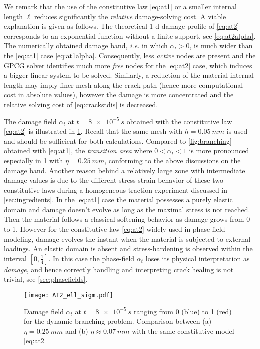 We remark that the use of the constitutive law \eqref{eq:at1} or a smaller internal length $\ell$ reduces significantly the \emph{relative} damage-solving cost. A viable explanation is given as follows. The theoretical 1-d damage profile of \eqref{eq:at2} corresponds to an exponential function without a finite support, see \eqref{eq:at2alpha}. The numerically obtained damage band, \emph{i.e.} in which $\alpha_t>0$, is much wider than the \eqref{eq:at1} case \eqref{eq:at1alpha}. Consequently, less \emph{active} nodes are present and the GPCG solver identifies much more \emph{free} nodes for the \eqref{eq:at2} case, which induces a bigger linear system to be solved. Similarly, a reduction of the material internal length may imply finer mesh along the crack path (hence more computational cost in absolute values), however the damage is more concentrated and the relative solving cost of \eqref{eq:crackstdis} is decreased.

The damage field $\alpha_t$ at $t=\SI{8e-5}{s}$ obtained with the constitutive law \eqref{eq:at2} is illustrated in \cref{fig:at2_ell_sigm}. Recall that the same mesh with $h=\SI{0.05}{mm}$ is used and should be sufficient for both calculations. Compared to \cref{fig:branching} obtained with \eqref{eq:at1}, the \emph{transition area} where $0<\alpha_t<1$ is more pronounced especially in \cref{fig:at2_ell_sigm} with $\eta=\SI{0.25}{mm}$, conforming to the above discussions on the damage band. Another reason behind a relatively large zone with intermediate damage values is due to the different stress-strain behavior of these two constitutive laws during a homogeneous traction experiment discussed in \cref{sec:ingredients}. In the \eqref{eq:at1} case the material possesses a purely elastic domain and damage doesn't evolve as long as the maximal stress is not reached. Then the material follows a classical softening behavior as damage grows from 0 to 1. However for the constitutive law \eqref{eq:at2} widely used in phase-field modeling, damage evolves the instant when the material is subjected to external loadings. An elastic domain is absent and stress-hardening is observed within the interval $[0,\frac{1}{4}]$. In this case the phase-field $\alpha_t$ loses its physical interpretation as \emph{damage}, and hence correctly handling and interpreting crack healing is not trivial, see \cref{sec:phasefields}.
\begin{figure}[htbp]
\centering
\texttt{[image: AT2\_ell\_sigm.pdf]}
\caption{Damage field $\alpha_t$ at $t=\SI{8e-5}{s}$ ranging from 0 (blue) to 1 (red) for the dynamic branching problem. Comparison between (a) $\eta=\SI{0.25}{mm}$ and (b) $\eta\approx\SI{0.07}{mm}$ with the same constitutive model \eqref{eq:at2}} \label{fig:at2_ell_sigm}
\end{figure}

